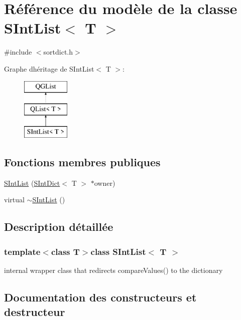 \hypertarget{class_s_int_list}{}\section{Référence du modèle de la classe S\+Int\+List$<$ T $>$}
\label{class_s_int_list}


{\ttfamily \#include $<$sortdict.\+h$>$}

Graphe d\textquotesingle{}héritage de S\+Int\+List$<$ T $>$\+:\begin{figure}[H]
\begin{center}
\leavevmode
\includegraphics[height=3.000000cm]{class_s_int_list}
\end{center}
\end{figure}
\subsection*{Fonctions membres publiques}
\begin{DoxyCompactItemize}
\item 
\hyperlink{class_s_int_list_afca4889e8c536be9025e40bb7897f234}{S\+Int\+List} (\hyperlink{class_s_int_dict}{S\+Int\+Dict}$<$ T $>$ $\ast$owner)
\item 
virtual \hyperlink{class_s_int_list_a92d7c50ccd74b589d2a2a3e9fffb752d}{$\sim$\+S\+Int\+List} ()
\end{DoxyCompactItemize}


\subsection{Description détaillée}
\subsubsection*{template$<$class T$>$class S\+Int\+List$<$ T $>$}

internal wrapper class that redirects compare\+Values() to the dictionary 

\subsection{Documentation des constructeurs et destructeur}
\hypertarget{class_s_int_list_afca4889e8c536be9025e40bb7897f234}{}
